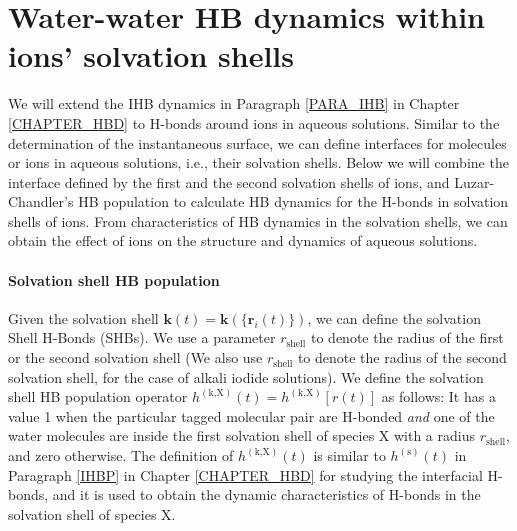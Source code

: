 \section{Water-water HB dynamics within ions' solvation shells} \label{PARA_SHBD}
We will extend the IHB dynamics in Paragraph \ref{PARA_IHB} in Chapter \ref{CHAPTER_HBD} to H-bonds around ions in aqueous solutions. 
Similar to the determination of the instantaneous surface, we can define interfaces for molecules or ions in aqueous solutions, i.e., 
their solvation shells. 
Below we will combine the interface defined by the first and the second solvation shells of ions, 
and Luzar-Chandler's HB population\cite{AL96} to calculate HB
dynamics for the H-bonds in solvation shells of ions.
From characteristics of HB dynamics in the solvation shells, we can obtain the effect of ions on the structure and dynamics of aqueous solutions. 

\newpage
\paragraph{Solvation shell HB population}\label{para:SHBP}
Given the solvation shell ${\mathbf k}(t)={\mathbf k}(\{{\mathbf r}_i(t)\})$, we can define the solvation Shell H-Bonds (SHBs).
We use a parameter $r_\text{shell}$ to denote the radius of the first or the second solvation shell 
(We also use $r_\text{shell}$ to denote the radius of the second solvation shell, for the case of alkali iodide solutions). 
We define the solvation shell HB population operator $h^{(\text{k,X})}(t) = h^{(\text{k,X})}[{r}(t)]$ as follows:
It has a value 1 when the particular tagged molecular pair are H-bonded \emph{and} one of the water molecules are inside the first solvation shell of species X
with a radius $r_\text{shell}$, and zero otherwise. 
The definition of $h^{(\text{k,X})}(t)$ is similar to $h^{(\text{s})}(t)$ in Paragraph \ref{IHBP} in Chapter \ref{CHAPTER_HBD} 
for studying the interfacial H-bonds, and it is used to obtain the dynamic characteristics of H-bonds in the solvation shell of species X. 

